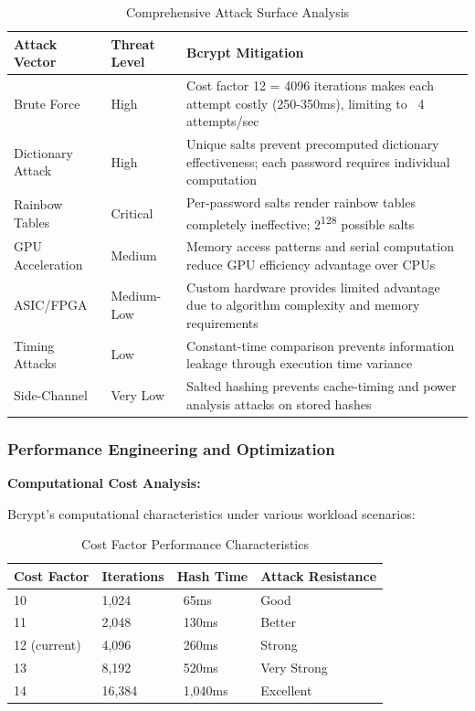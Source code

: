 \documentclass[12pt,a4paper]{article}
\begin{document}
\begin{tcolorbox}[colback=primaryblue!5, colframe=primaryblue, boxrule=1pt, arc=3pt, left=10pt, right=10pt, top=8pt, bottom=8pt]
\begin{table}[H]
\centering
\small
\begin{tabular}{|p{3.5cm}|p{4cm}|p{5cm}|}
\hline
\textbf{Attack Vector} & \textbf{Threat Level} & \textbf{Bcrypt Mitigation} \\
\hline
Brute Force & High & Cost factor 12 = 4096 iterations makes each attempt costly (250-350ms), limiting to ~4 attempts/sec \\
\hline
Dictionary Attack & High & Unique salts prevent precomputed dictionary effectiveness; each password requires individual computation \\
\hline
Rainbow Tables & Critical & Per-password salts render rainbow tables completely ineffective; 2\textsuperscript{128} possible salts \\
\hline
GPU Acceleration & Medium & Memory access patterns and serial computation reduce GPU efficiency advantage over CPUs \\
\hline
ASIC/FPGA & Medium-Low & Custom hardware provides limited advantage due to algorithm complexity and memory requirements \\
\hline
Timing Attacks & Low & Constant-time comparison prevents information leakage through execution time variance \\
\hline
Side-Channel & Very Low & Salted hashing prevents cache-timing and power analysis attacks on stored hashes \\
\hline
\end{tabular}
\caption{Comprehensive Attack Surface Analysis}
\end{table}

\subsubsection{Performance Engineering and Optimization}

\textbf{Computational Cost Analysis:}

Bcrypt's computational characteristics under various workload scenarios:

\begin{table}[H]
\centering
\begin{tabular}{|p{3cm}|p{3cm}|p{3cm}|p{3cm}|}
\hline
\textbf{Cost Factor} & \textbf{Iterations} & \textbf{Hash Time} & \textbf{Attack Resistance} \\
\hline
10 & 1,024 & ~65ms & Good \\
\hline
11 & 2,048 & ~130ms & Better \\
\hline
12 (current) & 4,096 & ~260ms & Strong \\
\hline
13 & 8,192 & ~520ms & Very Strong \\
\hline
14 & 16,384 & ~1,040ms & Excellent \\
\hline
\end{tabular}
\caption{Cost Factor Performance Characteristics}
\end{table}


\end{tcolorbox}
\end{document}
